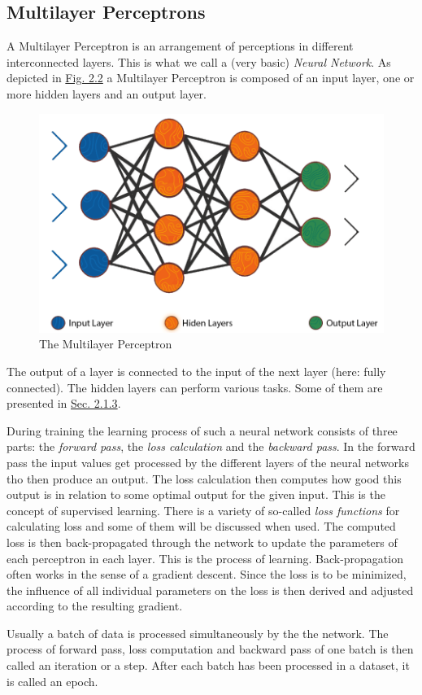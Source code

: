 \subsection{Multilayer Perceptrons}
A Multilayer Perceptron is an arrangement of perceptions in different interconnected layers. This is what we call a (very basic) \textit{Neural Network}. As depicted in \hyperref[fig:2.2]{Fig. 2.2} a Multilayer Perceptron is composed of an input layer, one or more hidden layers and an output layer. 
%
\begin{figure} \label{fig:2.2}
    \centering
    \includegraphics[width=.5\textwidth]{Chapters/figures/multilayer_perceptron.PNG}
    \caption{The Multilayer Perceptron}
\end{figure}
%
The output of a layer is connected to the input of the next layer (here: fully connected). The hidden layers can perform various tasks. Some of them are presented in \hyperref[sec:2.1.3]{Sec. 2.1.3}.

During training the learning process of such a neural network consists of three parts: the \textit{forward pass}, the \textit{loss calculation} and the \textit{backward pass}. In the forward pass the input values get processed by the different layers of the neural networks tho then produce an output. The loss calculation then computes how good this output is in relation to some optimal output for the given input. This is the concept of supervised learning. There is a variety of so-called \textit{loss functions} for calculating loss and some of them will be discussed when used. The computed loss is then back-propagated through the network to update the parameters of each perceptron in each layer. This is the process of learning. Back-propagation often works in the sense of a gradient descent. Since the loss is to be minimized, the influence of all individual parameters on the loss is then derived and adjusted according to the resulting gradient. 

Usually a batch of data is processed simultaneously by the the network. The process of forward pass, loss computation and backward pass of one batch is then called an iteration or a step. After each batch has been processed in a dataset, it is called an epoch.
%
